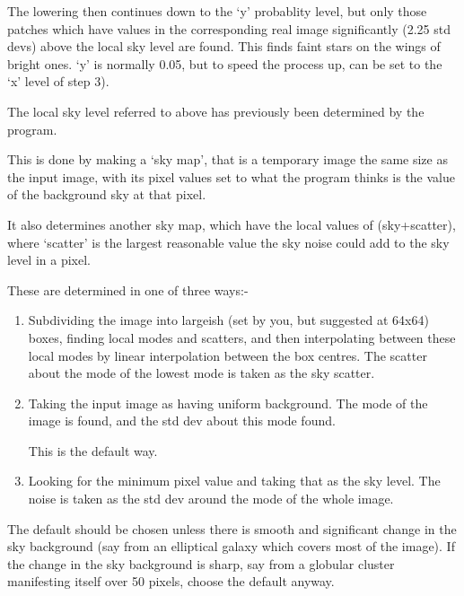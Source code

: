 \begin{small}
{{    The lowering then continues down to the `y' probablity level,
    but only those patches which have values in the corresponding
    real image significantly (2.25 std devs) above the local sky
    level are found. This finds faint stars on the wings of bright
    ones. `y' is normally 0.05, but to speed the process up, can
    be set to the `x' level of step 3).

 \vspace*{1mm}
 \hspace*{2em}{\bf Sky}
 \vspace*{1mm}

 The local sky level referred to above has previously been
 determined by the program.

 This is done by making a `sky map', that is a temporary image the
 same size as the input image, with its pixel values set to what the
 program thinks is the value of the background sky at that pixel.

 It also determines another sky map, which have the local values of
 (sky+scatter), where `scatter' is the largest reasonable value the
 sky noise could add to the sky level in a pixel.

 These are determined in one of three ways:-

 \begin{enumerate}
  \item Subdividing the image into largeish (set by you, but suggested
    at 64x64) boxes, finding local modes and scatters, and then
    interpolating between these local modes by linear interpolation
    between the box centres. The scatter about the
    mode of the lowest mode is taken as the sky scatter.

  \item Taking the input image as having uniform background. The mode of
        the image is found, and the std dev about this mode found.

        This is the default way.

  \item Looking for the minimum pixel value and taking that as the sky
    level. The noise is taken as the std dev around the mode of the whole
    image.

\end{enumerate}

 The default should be chosen unless there is smooth and
 significant change in the sky background (say from an elliptical
 galaxy which covers most of the image). If the
 change in the sky background is sharp, say from a globular cluster
 manifesting itself over 50 pixels, choose the default anyway.

}}
\end{small}
